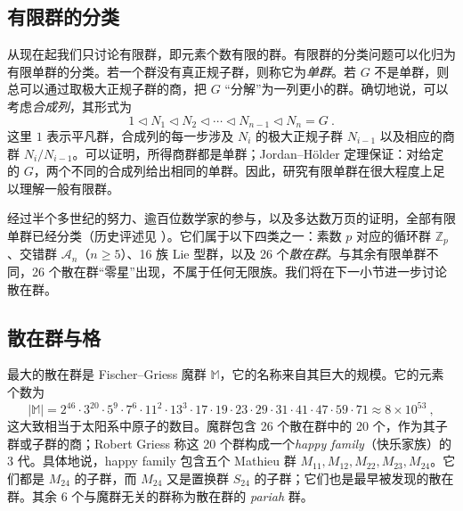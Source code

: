 \documentclass[11pt,a4paper,fontset=windows]{ctexart}
\numberwithin{equation}{section}
\newcommand{\ZZ}{\mathbb{Z}}
\begin{document}
\subsection{有限群的分类}

从现在起我们只讨论有限群，即元素个数有限的群。有限群的分类问题可以化归为有限单群的分类。若一个群没有真正规子群，则称它为\emph{单群}。若 $G$ 不是单群，则总可以通过取极大正规子群的商，把 $G$ “分解”为一列更小的群。确切地说，可以考虑\emph{合成列}，其形式为
\begin{equation}
1\triangleleft N_1\triangleleft N_2\triangleleft\cdots \triangleleft N_{n-1}\triangleleft N_n=G~.
\end{equation}
这里 $1$ 表示平凡群，合成列的每一步涉及 $N_i$ 的极大正规子群 $N_{i-1}$ 以及相应的商群 $N_i/N_{i-1}$。可以证明，所得商群都是单群；Jordan--H{\"o}lder 定理保证：对给定的 $G$，两个不同的合成列给出相同的单群。因此，研究有限单群在很大程度上足以理解一般有限群。

经过半个多世纪的努力、逾百位数学家的参与，以及多达数万页的证明，全部有限单群已经分类（历史评述见 \cite{GorensteinDaniel1982Fsg:, RonaldSolomon2001Abho}）。它们属于以下四类之一：素数 $p$ 对应的循环群 $\ZZ_p$、交错群 $\mathcal{A}_n$（$n\geq5$）、16 族 Lie 型群，以及 26 个\emph{散在群}。与其余有限单群不同，26 个散在群“零星”出现，不属于任何无限族。我们将在下一小节进一步讨论散在群。


\subsection{散在群与格}
\label{sec:sporadic_lattices}

最大的散在群是 Fischer–Griess 魔群 $\mathbb M$，它的名称来自其巨大的规模。它的元素个数为
\[
|\mathbb M| =  2^{46} \cdot 3^{20} \cdot 5^9 \cdot 7^6 \cdot 11^2 \cdot 13^3 \cdot 17 \cdot 19 \cdot 23 \cdot 29 \cdot 31 \cdot 41 \cdot 47 \cdot 59 \cdot 71 \approx 8 \times 10^{53}~, 
\]
这大致相当于太阳系中原子的数目。魔群包含 26 个散在群中的 20 个，作为其子群或子群的商；Robert Griess 称这 20 个群构成一个\emph{happy family}（快乐家族）的 3 代。具体地说，happy family 包含五个 Mathieu 群 $M_{11}, M_{12}, M_{22}, M_{23}, M_{24}$。它们都是 $M_{24}$ 的子群，而 $M_{24}$ 又是置换群 $S_{24}$ 的子群；它们也是最早被发现的散在群。其余 6 个与魔群无关的群称为散在群的 \emph{pariah} 群。
\end{document}
